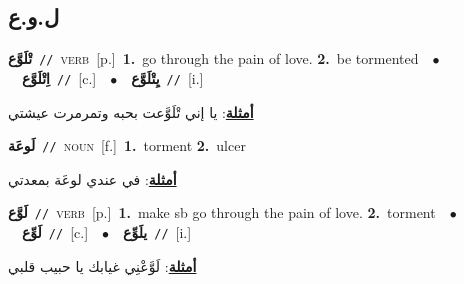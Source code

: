 \documentclass[10pt,a4paper,twoside]{article} %
\begin{document}
\begin{multicols}{2}
\vspace{-3mm}
\subsection*{\color{blue}\foreignlanguage{arabic}{ل.و.ع}\color{blue}{}} 

{\setlength\topsep{0pt}\textbf{\foreignlanguage{arabic}{تْلَوَّع}}\ {\color{gray}\texttt{//}\color{black}}\ \textsc{verb}\ [p.]\ \textbf{1.}~go through the pain of love.  \textbf{2.}~be tormented\ \ $\bullet$\ \ \setlength\topsep{0pt}\textbf{\foreignlanguage{arabic}{اِتْلَوَّع}}\ {\color{gray}\texttt{//}\color{black}}\ [c.]\ \ $\bullet$\ \ \setlength\topsep{0pt}\textbf{\foreignlanguage{arabic}{يِتْلَوَّع}}\ {\color{gray}\texttt{//}\color{black}}\ [i.]\  \begin{flushright}\color{gray}\foreignlanguage{arabic}{\textbf{\underline{\foreignlanguage{arabic}{أمثلة}}}: يا إني تْلَوَّعت بحبه وتمرمرت عيشتي}\end{flushright}\color{black}} \vspace{2mm}

{\setlength\topsep{0pt}\textbf{\foreignlanguage{arabic}{لَوعَة}}\ {\color{gray}\texttt{//}\color{black}}\ \textsc{noun}\ [f.]\ \textbf{1.}~torment  \textbf{2.}~ulcer\  \begin{flushright}\color{gray}\foreignlanguage{arabic}{\textbf{\underline{\foreignlanguage{arabic}{أمثلة}}}: في عندي لوعَة بمعدتي}\end{flushright}\color{black}} \vspace{2mm}

{\setlength\topsep{0pt}\textbf{\foreignlanguage{arabic}{لَوَّع}}\ {\color{gray}\texttt{//}\color{black}}\ \textsc{verb}\ [p.]\ \textbf{1.}~make sb go through the pain of love.  \textbf{2.}~torment\ \ $\bullet$\ \ \setlength\topsep{0pt}\textbf{\foreignlanguage{arabic}{لَوِّع}}\ {\color{gray}\texttt{//}\color{black}}\ [c.]\ \ $\bullet$\ \ \setlength\topsep{0pt}\textbf{\foreignlanguage{arabic}{يلَوِّع}}\ {\color{gray}\texttt{//}\color{black}}\ [i.]\  \begin{flushright}\color{gray}\foreignlanguage{arabic}{\textbf{\underline{\foreignlanguage{arabic}{أمثلة}}}: لَوَّعْنِي غيابك يا حبيب قلبي}\end{flushright}\color{black}} \vspace{2mm}


\end{multicols}
\end{document}
